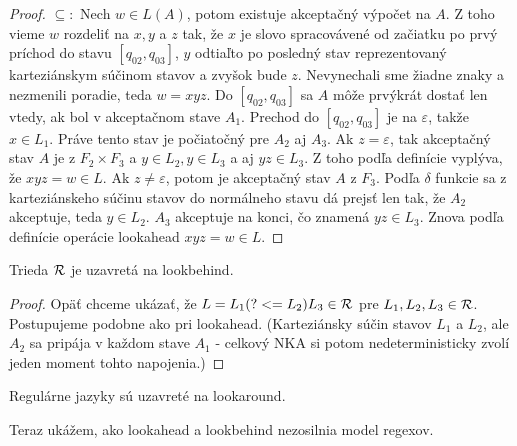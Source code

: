 \begin{proof}
$ \subseteq: $ Nech $w \in L(A)$, potom existuje akceptačný výpočet na $A$. Z toho vieme $w$ rozdeliť na $x,y$ a $z$ tak, že $x$ je slovo spracovávené od začiatku po prvý príchod do stavu $\left[q_{02},q_{03}\right]$, $y$ odtiaľto po posledný stav reprezentovaný karteziánskym súčinom stavov a zvyšok bude $z$. Nevynechali sme žiadne znaky a nezmenili poradie, teda $w=xyz$. Do $\left[q_{02},q_{03}\right]$ sa $A$ môže prvýkrát dostať len vtedy, ak bol v akceptačnom stave $A_1$. Prechod do $\left[q_{02},q_{03}\right]$ je na $\varepsilon$, takže $x \in L_1$. Práve tento stav je počiatočný pre $A_2$ aj $A_3$. Ak $z=\varepsilon$, tak akceptačný stav $A$ je z $F_2\times F_3$ a $y \in L_2, y \in L_3$ a aj $yz \in L_3$. Z toho podľa definície vyplýva, že $xyz=w \in L$. Ak $z\neq \varepsilon$, potom je akceptačný stav $A$ z $F_3$. Podľa $\delta$ funkcie sa z karteziánskeho súčinu stavov do normálneho stavu dá prejsť len tak, že $A_2$ akceptuje, teda $y \in L_2$. $A_3$ akceptuje na konci, čo znamená $yz \in L_3$. Znova podľa definície operácie lookahead $xyz=w \in L$.
\end{proof}

\begin{lema}
Trieda ${\cal R}$ je uzavretá na lookbehind.
\end{lema}
\begin{proof}
Opäť chceme ukázať, že $ L = L_{1}(?<=L_{2})L_{3} \in {\cal R} $ pre $ L_{1}, L_{2}, L_{3} \in {\cal R} $. Postupujeme podobne ako pri lookahead. (Karteziánsky súčin stavov $L_1$ a $L_2$, ale $A_2$ sa pripája v každom stave $A_1$ - celkový NKA si potom nedeterministicky zvolí jeden moment tohto napojenia.)
\end{proof}

\begin{veta}\label{lookahead+R}
Regulárne jazyky sú uzavreté na lookaround.
\end{veta}

Teraz ukážem, ako lookahead a lookbehind nezosilnia model regexov.

